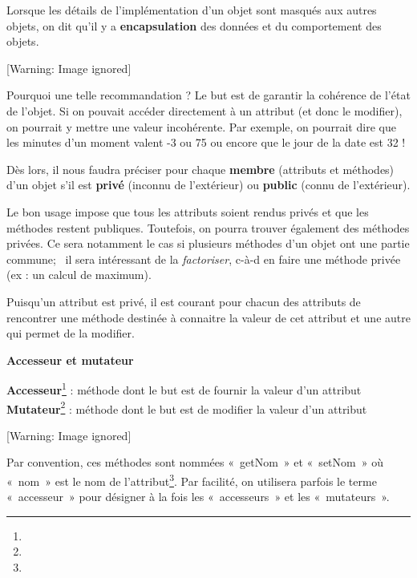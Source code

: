 {
Lorsque les détails de l'implémentation
d'un objet sont masqués aux autres objets, on dit
qu'il y a \textbf{encapsulation} des données et du
comportement des objets.}

\begin{center}
 [Warning: Image ignored] %

\end{center}
{
Pourquoi une telle recommandation ? Le but est de garantir la cohérence
de l'état de l'objet. Si on pouvait
accéder directement à un attribut (et donc le modifier), on pourrait y
mettre une valeur incohérente. Par exemple, on pourrait dire que les
minutes d'un moment valent -3 ou 75 ou encore que le
jour de la date est 32 !}

{
Dès lors, il nous faudra préciser pour chaque \textbf{membre} (attributs
et méthodes) d'un objet s'il est
\textbf{privé} (inconnu de l'extérieur) ou
\textbf{public} (connu de l'extérieur). }

{
Le bon usage impose que tous les attributs soient rendus privés et que
les méthodes restent publiques. Toutefois, on pourra trouver également
des méthodes privées. Ce sera notamment le cas si plusieurs méthodes
d'un objet ont une partie commune; \ il sera
intéressant de la \textit{factoriser}, c-à-d en faire une méthode
privée (ex : un calcul de maximum).}

{
Puisqu'un attribut est privé, il est courant pour
chacun des attributs de rencontrer une méthode destinée à connaitre la
valeur de cet attribut et une autre qui permet de la modifier.}

{\sffamily\bfseries\upshape
Accesseur et mutateur}

{
\textbf{Accesseur}\footnote{} : méthode dont le but est de
fournir la valeur d'un attribut
\textbf{Mutateur}\footnote{} : méthode dont le but est de
modifier la valeur d'un attribut}

\begin{center}
 [Warning: Image ignored] %

\end{center}
{
Par convention, ces méthodes sont nommées «~getNom~» et «~setNom~» où
«~nom~» est le nom de
l'attribut\footnote{}. Par facilité, on utilisera parfois le terme «~accesseur~»
pour désigner à la fois les «~accesseurs~» et les «~mutateurs~».}

